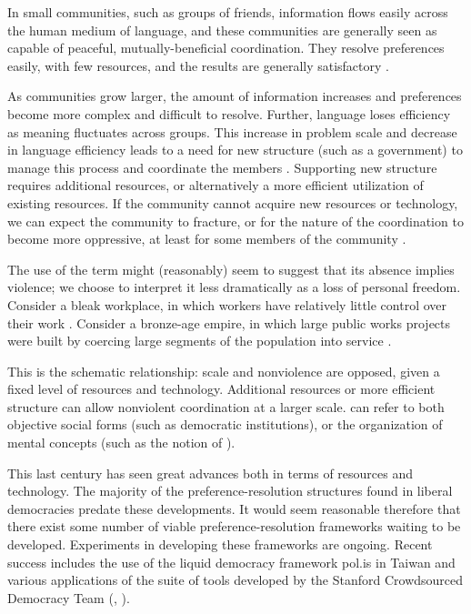In small communities, such as groups of friends, information flows easily across the human medium of language, and these communities are generally seen as capable of peaceful, mutually-beneficial coordination.
They resolve preferences easily, with few resources, and the results are generally satisfactory \citep{deacon}.

As communities grow larger, the amount of information increases and preferences become more complex and difficult to resolve.
Further, language loses efficiency as meaning fluctuates across groups.
This increase in problem scale and decrease in language efficiency leads to a need for new structure (such as a government) to manage this process and coordinate the members \citep{hobbes}.
Supporting new structure requires additional resources, or alternatively a more efficient utilization of existing resources.
If the community cannot acquire new resources or technology, we can expect the community to fracture, or for the nature of the coordination to become more oppressive, at least for some members of the community \citep{eisenberg}.

The use of the term  might (reasonably) seem to suggest that its absence implies violence; we choose to interpret it less dramatically as a loss of personal freedom.
Consider a bleak workplace, in which workers have relatively little control over their work \citep{lin}.
Consider a bronze-age empire, in which large public works projects were built by coercing large segments of the population into service \citep{heilbroner}.

\bigskip

This is the schematic relationship: scale and nonviolence are opposed, given a fixed level of resources and technology.
Additional resources or more efficient structure can allow nonviolent coordination at a larger scale.
 can refer to both objective social forms (such as democratic institutions), or the organization of mental concepts (such as the notion of ).

This last century has seen great advances both in terms of resources and technology.
The majority of the preference-resolution structures found in liberal democracies predate these developments.
It would seem reasonable therefore that there exist some number of viable preference-resolution frameworks waiting to be developed.
Experiments in developing these frameworks are ongoing.
Recent success includes the use of the liquid democracy framework pol.is in Taiwan \citep{barry} and various applications of the suite of tools developed by the Stanford Crowdsourced Democracy Team (\cite{lee:2015}, \cite{aitamurto:2016}).

